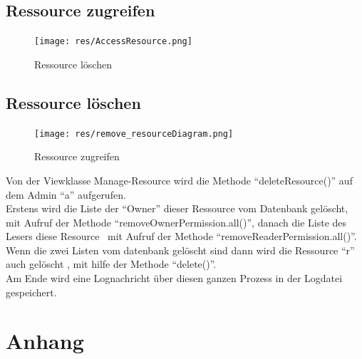 \documentclass[parskip=full,11pt]{scrartcl}
\begin{document}
 
 
  \newpage
    \newpage
 \subsection{Ressource zugreifen}
 \begin{figure}[ht!]
 	\centering
 	\texttt{[image: res/AccessResource.png]}
 	\caption{Ressource löschen}
 \end{figure}
 
 \subsection{Ressource löschen}
 \begin{figure}[ht!]
 	\centering
 	\texttt{[image: res/remove\_resourceDiagram.png]}
 	\caption{Ressource zugreifen}
 \end{figure}
 
 
 Von der Viewklasse Manage-Resource wird die Methode \enquote{deleteResource()} auf dem Admin \enquote{a}  aufgerufen.\\ Erstens wird die Liste der \enquote{Owner} dieser Ressource vom Datenbank gelöscht, mit Aufruf der Methode \enquote{removeOwnerPermission.all()}, danach die Liste des Lesers diese Resource \ mit Aufruf der Methode \enquote{removeReaderPermission.all()}.\\
 Wenn die zwei Listen vom datenbank gelöscht sind dann wird die Ressource \enquote{r} auch gelöscht , mit hilfe der Methode \enquote{delete()}.\\ Am Ende wird eine Lognachricht über diesen ganzen Prozess  in der Logdatei gespeichert.\\
 
 \newpage
 \section{Anhang}
 \newpage
{}
\printglossary	
	
 
\end{document}
